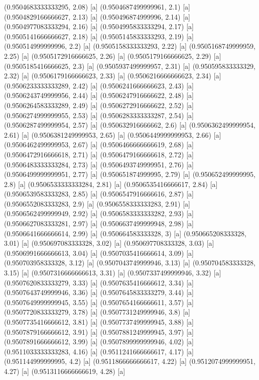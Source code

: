 {{{(0.9504683333333295, 2.08) [a] 
(0.9504687499999961, 2.1) [a] 
(0.9504829166666627, 2.13) [a] 
(0.950496874999996, 2.14) [a] 
(0.9504977083333294, 2.16) [a] 
(0.9504995833333294, 2.17) [a] 
(0.9505141666666627, 2.18) [a] 
(0.9505145833333293, 2.19) [a] 
(0.950514999999996, 2.2) [a] 
(0.9505158333333293, 2.22) [a] 
(0.9505168749999959, 2.25) [a] 
(0.9505172916666625, 2.26) [a] 
(0.9505179166666625, 2.29) [a] 
(0.9505185416666625, 2.3) [a] 
(0.9505937499999957, 2.31) [a] 
(0.950595833333329, 2.32) [a] 
(0.9506179166666623, 2.33) [a] 
(0.9506216666666623, 2.34) [a] 
(0.9506233333333289, 2.42) [a] 
(0.9506241666666623, 2.43) [a] 
(0.9506243749999956, 2.44) [a] 
(0.9506247916666622, 2.48) [a] 
(0.9506264583333289, 2.49) [a] 
(0.9506272916666622, 2.52) [a] 
(0.9506274999999955, 2.53) [a] 
(0.9506283333333287, 2.54) [a] 
(0.9506287499999954, 2.57) [a] 
(0.950632916666662, 2.6) [a] 
(0.9506362499999954, 2.61) [a] 
(0.9506381249999953, 2.65) [a] 
(0.9506449999999953, 2.66) [a] 
(0.9506462499999953, 2.67) [a] 
(0.9506466666666619, 2.68) [a] 
(0.9506472916666618, 2.71) [a] 
(0.9506479166666618, 2.72) [a] 
(0.9506483333333284, 2.73) [a] 
(0.9506493749999951, 2.76) [a] 
(0.9506499999999951, 2.77) [a] 
(0.950651874999995, 2.79) [a] 
(0.950652499999995, 2.8) [a] 
(0.9506533333333284, 2.81) [a] 
(0.9506535416666617, 2.84) [a] 
(0.9506539583333283, 2.85) [a] 
(0.9506547916666616, 2.87) [a] 
(0.9506552083333283, 2.9) [a] 
(0.9506558333333283, 2.91) [a] 
(0.9506562499999949, 2.92) [a] 
(0.9506583333333282, 2.93) [a] 
(0.9506627083333281, 2.97) [a] 
(0.9506637499999948, 2.98) [a] 
(0.9506641666666614, 2.99) [a] 
(0.950664583333328, 3) [a] 
(0.950665208333328, 3.01) [a] 
(0.950697083333328, 3.02) [a] 
(0.950697708333328, 3.03) [a] 
(0.9506991666666613, 3.04) [a] 
(0.9507035416666614, 3.09) [a] 
(0.950703958333328, 3.12) [a] 
(0.9507043749999946, 3.13) [a] 
(0.950704583333328, 3.15) [a] 
(0.9507316666666613, 3.31) [a] 
(0.9507337499999946, 3.32) [a] 
(0.9507620833333279, 3.33) [a] 
(0.9507635416666612, 3.34) [a] 
(0.9507643749999946, 3.36) [a] 
(0.9507645833333279, 3.44) [a] 
(0.9507649999999945, 3.55) [a] 
(0.9507654166666611, 3.57) [a] 
(0.9507720833333279, 3.78) [a] 
(0.9507731249999946, 3.8) [a] 
(0.9507735416666612, 3.81) [a] 
(0.9507737499999945, 3.88) [a] 
(0.9507879166666612, 3.91) [a] 
(0.9507881249999945, 3.97) [a] 
(0.9507891666666612, 3.99) [a] 
(0.9507899999999946, 4.02) [a] 
(0.9511033333333283, 4.16) [a] 
(0.9511241666666617, 4.17) [a] 
(0.951144999999995, 4.2) [a] 
(0.9511866666666617, 4.22) [a] 
(0.9512074999999951, 4.27) [a] 
(0.9513116666666619, 4.28) [a] 
}}}
